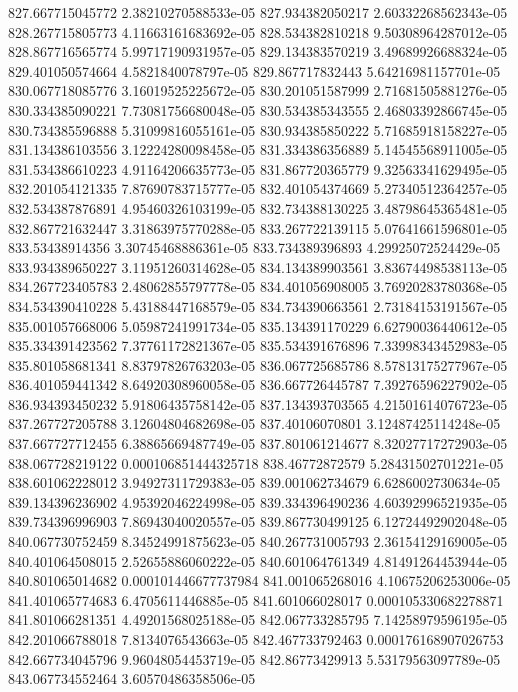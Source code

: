 {827.667715045772 2.38210270588533e-05
827.934382050217 2.60332268562343e-05
828.267715805773 4.11663161683692e-05
828.534382810218 9.50308964287012e-05
828.867716565774 5.99717190931957e-05
829.134383570219 3.49689926688324e-05
829.401050574664 4.5821840078797e-05
829.867717832443 5.64216981157701e-05
830.067718085776 3.16019525225672e-05
830.201051587999 2.71681505881276e-05
830.334385090221 7.73081756680048e-05
830.534385343555 2.46803392866745e-05
830.734385596888 5.31099816055161e-05
830.934385850222 5.71685918158227e-05
831.134386103556 3.12224280098458e-05
831.334386356889 5.14545568911005e-05
831.534386610223 4.91164206635773e-05
831.867720365779 9.32563341629495e-05
832.201054121335 7.87690783715777e-05
832.401054374669 5.27340512364257e-05
832.534387876891 4.95460326103199e-05
832.734388130225 3.48798645365481e-05
832.867721632447 3.31863975770288e-05
833.267722139115 5.07641661596801e-05
833.53438914356 3.30745468886361e-05
833.734389396893 4.29925072524429e-05
833.934389650227 3.11951260314628e-05
834.134389903561 3.83674498538113e-05
834.267723405783 2.48062855797778e-05
834.401056908005 3.76920283780368e-05
834.534390410228 5.43188447168579e-05
834.734390663561 2.73184153191567e-05
835.001057668006 5.05987241991734e-05
835.134391170229 6.62790036440612e-05
835.334391423562 7.37761172821367e-05
835.534391676896 7.33998343452983e-05
835.801058681341 8.83797826763203e-05
836.067725685786 8.57813175277967e-05
836.401059441342 8.64920308960058e-05
836.667726445787 7.39276596227902e-05
836.934393450232 5.91806435758142e-05
837.134393703565 4.21501614076723e-05
837.267727205788 3.12604804682698e-05
837.40106070801 3.12487425114248e-05
837.667727712455 6.38865669487749e-05
837.801061214677 8.32027717272903e-05
838.067728219122 0.000106851444325718
838.46772872579 5.28431502701221e-05
838.601062228012 3.94927311729383e-05
839.001062734679 6.6286002730634e-05
839.134396236902 4.95392046224998e-05
839.334396490236 4.60392996521935e-05
839.734396996903 7.86943040020557e-05
839.867730499125 6.12724492902048e-05
840.067730752459 8.34524991875623e-05
840.267731005793 2.36154129169005e-05
840.401064508015 2.52655886060222e-05
840.601064761349 4.81491264453944e-05
840.801065014682 0.000101446677737984
841.001065268016 4.10675206253006e-05
841.401065774683 6.4705611446885e-05
841.601066028017 0.000105330682278871
841.801066281351 4.49201568025188e-05
842.067733285795 7.14258979596195e-05
842.201066788018 7.8134076543663e-05
842.467733792463 0.000176168907026753
842.667734045796 9.96048054453719e-05
842.86773429913 5.53179563097789e-05
843.067734552464 3.60570486358506e-05
}
